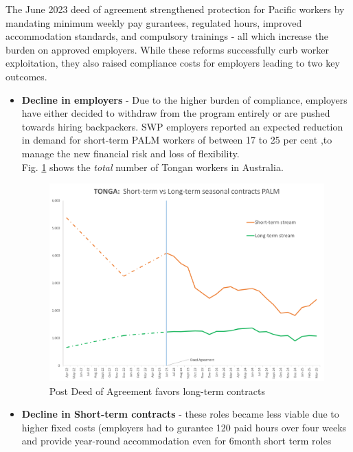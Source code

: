\documentclass[9pt,a4paper,twocolumn,twoside]{tau-class/tau}
\begin{document}
 The June 2023 deed of agreement strengthened protection for Pacific workers by mandating minimum weekly pay gurantees, regulated hours, improved accommodation standards, and compulsory trainings - all which increase the burden on approved employers. While these reforms successfully curb worker exploitation, they also raised compliance costs for employers leading to two key outcomes.

  \begin{itemize}
   \item \textbf{Decline in employers} - Due to the higher burden of compliance, employers have either decided to withdraw from the program entirely or are pushed towards hiring backpackers. SWP employers reported an expected reduction in demand for short-term PALM workers of between 17 to 25 per cent \cite{Bradford},to manage the new financial risk and loss of flexibility.
   \\


  
        	Fig. \ref{fig:shortvslong} shows the \textit{total} number of Tongan workers in Australia.
    		
    		
    	\begin{figure}[H]
    		\centering
    		\includegraphics[width=0.9\columnwidth]{figures/Tonga_short-term.png}
    		\caption{Post Deed of Agreement favors long-term contracts}
    		\label{fig:shortvslong}
    	\end{figure}

          \item \textbf{Decline in Short-term contracts} - these roles became less viable due to higher fixed costs (employers had to gurantee 120 paid hours over four weeks and provide year-round accommodation even for 6month short term roles \cite{Bradford_a}
          
\end{itemize}
\end{document}
